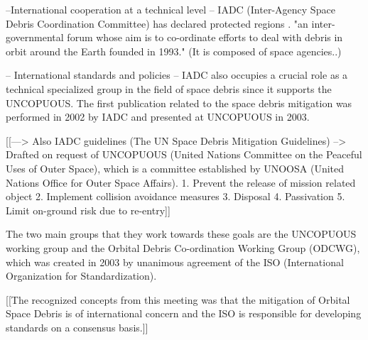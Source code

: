 --International cooperation at a technical level --
IADC (Inter-Agency Space Debris Coordination Committee) has declared protected regions \cite{IADC 2007}. "an inter-governmental forum whose aim is to co-ordinate efforts to deal with debris in orbit around the Earth founded in 1993." (It is composed of space agencies..)


-- International standards and policies --
IADC also occupies a crucial role as a technical specialized group in the field of space debris since it supports the UNCOPUOUS.
The first publication related to the space debris mitigation was performed in 2002 by IADC and presented at UNCOPUOUS in 2003.

[[---> Also IADC guidelines (The UN Space Debris Mitigation Guidelines) --> Drafted on request of UNCOPUOUS (United Nations Committee on the Peaceful Uses of Outer Space), which is a committee established by UNOOSA (United Nations Office for Outer Space Affairs). \cite{IADC 2007}
1. Prevent the release of mission related object
2. Implement collision avoidance measures
3. Disposal
4. Passivation
5. Limit on-ground risk due to re-entry]]

The two main groups that they work towards these goals are the UNCOPUOUS working group and the Orbital Debris Co-ordination Working Group (ODCWG), which was created in 2003 by unanimous agreement of the ISO (International Organization for Standardization).

[[The recognized concepts from this meeting was that the mitigation of Orbital Space Debris is of international concern and the ISO is responsible for developing standards on a consensus basis.]]


